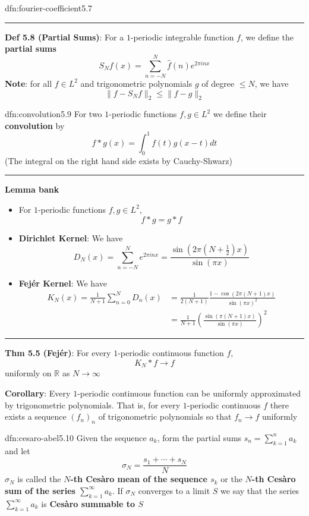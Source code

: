 \documentclass[landscape, 8pt]{extarticle}
\begin{document}
\begin{multicols}{3}
\begin{dfn}{dfn:fourier-coefficient}{5.7}
	\noindent\rule{\textwidth}{0.2pt}
	\textbf{Def 5.8 (Partial Sums)}: For a $1$-periodic integrable function $f$, we define the \textbf{partial sums}
	\[S_{N}f(x) = \sum_{n = -N}^{N}\widehat{f}(n)e^{2 \pi inx}\]
	\textbf{Note}: for all $f\in L^{2}$ and trigonometric polynomials $g$ of degree $\le N$, we have
	\[\lVert f - S_{N} f \rVert_{2} \le \lVert f - g \rVert_{2}\]
\end{dfn}

\begin{dfn}[Convolution]{dfn:convolution}{5.9}
	For two $1$-periodic functions $f, g\in L^{2}$ we define their \textbf{convolution} by
	\[f * g(x) = \int_{0}^{1} f(t)g(x - t) dt\]
	(The integral on the right hand side exists by Cauchy-Shwarz)

	\noindent\rule{\textwidth}{0.2pt}
	\textbf{Lemma bank}
	\begin{itemize}
	    \setlength\itemsep{0em}
	    \item[\textbf{5.2}] For $1$-periodic functions $f, g\in L^{2}$,
			\[f * g = g * f\]
		\item[\textbf{5.3}] \textbf{Dirichlet Kernel}: We have
			\[D_{N}(x) = \sum_{n = -N}^{N} e^{2 \pi inx} = \frac{\sin(2 \pi(N + \frac{1}{2})x)}{\sin( \pi x)}\]
		\item[\textbf{5.4}] \textbf{Fejér Kernel}:  We have
			\begin{align*}
				K_{N}(x) = \frac{1}{N+1} \sum_{n = 0}^{N} D_{n}(x) &= \frac{1}{2(N+1)} \frac{1 - \cos(2\pi(N + 1)x)}{\sin(\pi x)^{2}}\\
						 &= \frac{1}{N+1} \left( \frac{\sin(\pi(N + 1) x)}{\sin(\pi x)}\right)^{2}
			\end{align*}
	\end{itemize}
	\noindent\rule{\textwidth}{0.2pt}
	\textbf{Thm 5.5 (Fejér)}: For every $1$-periodic continuous function $f$,
	\[K_{N} * f \to f\]
	uniformly on $\mathbb{R}$ as $N\to\infty$

	\textbf{Corollary}: Every $1$-periodic continuous function can be uniformly approximated by trigonometric polynomials. That is, for every $1$-periodic continuous $f$ there exists a sequence $(f_{n})_{n}$ of trigonometric polynomials so that $f_{n} \to f$ uniformly

\end{dfn}

\begin{dfn}{dfn:cesaro-abel}{5.10}
	Given the sequence $a_{k}$, form the partial sums $s_{n} = \sum_{k = 1}^{n} a_{k}$ and let
	\[\sigma_{N} = \frac{s_{1} + \cdots + s_{N}}{N}\]
	$\sigma_{N}$ is called the \textbf{$N$-th Cesàro mean of the sequence $s_{k}$} or the \textbf{$N$-th Cesàro sum of the series $\sum_{k = 1}^{\infty} a_{k}$}. If $\sigma_{N}$ converges to a limit $S$ we say that the series $\sum_{k = 1}^{\infty} a_{k}$ is \textbf{Cesàro summable to $S$}


\end{dfn}
\end{multicols}
\end{document}
